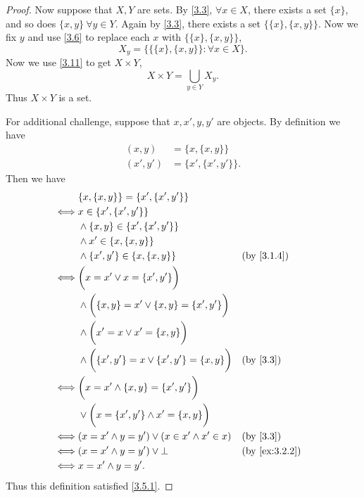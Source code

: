\begin{proof}
  Now suppose that \(X, Y\) are sets.
  By \cref{3.3}, \(\forall x \in X\), there exists a set \(\{x\}\), and so does \(\{x, y\} \ \forall y \in Y\).
  Again by \cref{3.3}, there exists a set \(\{\{x\}, \{x, y\}\}\).
  Now we fix \(y\) and use \cref{3.6} to replace each \(x\) with \(\{\{x\}, \{x, y\}\}\),
  \[
    X_y = \{\{\{x\}, \{x, y\}\} : \forall x \in X\}.
  \]
  Now we use \cref{3.11} to get \(X \times Y\),
  \[
    X \times Y = \bigcup_{y \in Y} X_y.
  \]
  Thus \(X \times Y\) is a set.

  For additional challenge, suppose that \(x, x', y, y'\) are objects.
  By definition we have
  \begin{align*}
    (x, y)   & = \{x, \{x, y\}\}     \\
    (x', y') & = \{x', \{x', y'\}\}.
  \end{align*}
  Then we have
  \begin{align*}
         & \{x, \{x, y\}\} = \{x', \{x', y'\}\}                                                         \\
    \iff & x \in \{x', \{x', y'\}\}                                                                     \\
         & \land \{x, y\} \in \{x', \{x', y'\}\}                                                        \\
         & \land x' \in \{x, \{x, y\}\}                                                                 \\
         & \land \{x', y'\} \in \{x, \{x, y\}\}                        &  & \by{3.1.4}                  \\
    \iff & \bigg(x = x' \lor x = \{x', y'\}\bigg)                                                       \\
         & \land \bigg(\{x, y\} = x' \lor \{x, y\} = \{x', y'\}\bigg)                                   \\
         & \land \bigg(x' = x \lor x' = \{x, y\}\bigg)                                                  \\
         & \land \bigg(\{x', y'\} = x \lor \{x', y'\} = \{x, y\}\bigg) &  & \text{(by \cref{3.3})}      \\
    \iff & \bigg(x = x' \land \{x, y\} = \{x', y'\}\bigg)                                               \\
         & \lor \bigg(x = \{x', y'\} \land x' = \{x, y\}\bigg)                                          \\
    \iff & (x = x' \land y = y') \lor (x \in x' \land x' \in x)        &  & \text{(by \cref{3.3})}      \\
    \iff & (x = x' \land y = y') \lor \bot                             &  & \text{(by \cref{ex:3.2.2})} \\
    \iff & x = x' \land y = y'.
  \end{align*}
  Thus this definition satisfied \cref{3.5.1}.
\end{proof}

